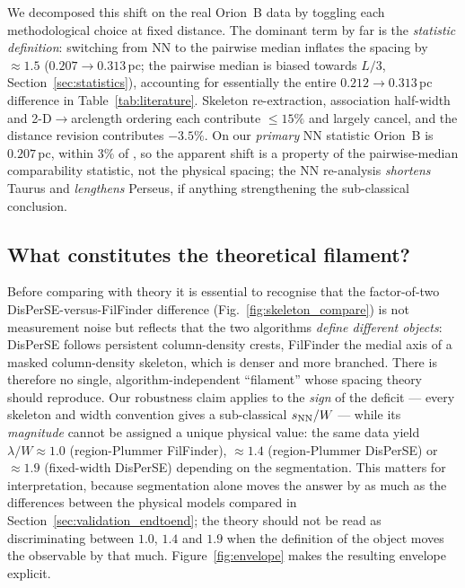 \documentclass[usenatbib,twoside,twocolumn]{mnras}
\begin{document}
We decomposed this shift on the real Orion~B data by toggling each methodological choice at fixed distance. The dominant term by far is the \emph{statistic definition}: switching from NN to the pairwise median inflates the spacing by $\approx1.5$ ($0.207\to0.313$\,pc; the pairwise median is biased towards $L/3$, Section~\ref{sec:statistics}), accounting for essentially the entire $0.212\to0.313$\,pc difference in Table~\ref{tab:literature}. Skeleton re-extraction, association half-width and 2-D$\to$arclength ordering each contribute $\le15\%$ and largely cancel, and the distance revision contributes $-3.5\%$. On our \emph{primary} NN statistic Orion~B is $0.207$\,pc, within $3\%$ of \citet{Konyves2020}, so the apparent shift is a property of the pairwise-median comparability statistic, not the physical spacing; the NN re-analysis \emph{shortens} Taurus and \emph{lengthens} Perseus, if anything strengthening the sub-classical conclusion.

\subsection{What constitutes the theoretical filament?}
\label{sec:whatfilament}
Before comparing with theory it is essential to recognise that the factor-of-two DisPerSE-versus-FilFinder difference (Fig.~\ref{fig:skeleton_compare}) is not measurement noise but reflects that the two algorithms \emph{define different objects}: DisPerSE follows persistent column-density crests, FilFinder the medial axis of a masked column-density skeleton, which is denser and more branched. There is therefore no single, algorithm-independent ``filament'' whose spacing theory should reproduce. Our robustness claim applies to the \emph{sign} of the deficit --- every skeleton and width convention gives a sub-classical $s_{\rm NN}/W$ --- while its \emph{magnitude} cannot be assigned a unique physical value: the same data yield $\lambda/W\approx1.0$ (region-Plummer FilFinder), $\approx1.4$ (region-Plummer DisPerSE) or $\approx1.9$ (fixed-width DisPerSE) depending on the segmentation. This matters for interpretation, because segmentation alone moves the answer by as much as the differences between the physical models compared in Section~\ref{sec:validation_endtoend}; the theory should not be read as discriminating between $1.0$, $1.4$ and $1.9$ when the definition of the object moves the observable by that much. Figure~\ref{fig:envelope} makes the resulting envelope explicit.
\end{document}
